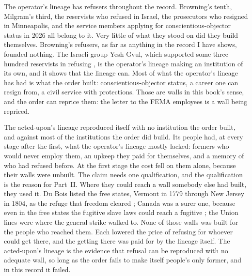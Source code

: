 The operator's lineage has refusers throughout the record. Browning's tenth, Milgram's third, the reservists who refused in Israel, the prosecutors who resigned in Minneapolis, and the service members applying for conscientious-objector status in 2026 all belong to it. Very little of what they stood on did they build themselves. Browning's refusers, as far as anything in the record I have shows, founded nothing. The Israeli group Yesh Gvul, which supported some three hundred reservists in refusing \autocite{ziv2025refusers}, is the operator's lineage making an institution of its own, and it shows that the lineage can. Most of what the operator's lineage has had is what the order built: conscientious-objector status, a career one can resign from, a civil service with protections. Those are walls in this book's sense, and the order can reprice them: the letter to the FEMA employees is a wall being repriced.

The acted-upon's lineage reproduced itself with no institution the order built, and against most of the institutions the order did build. Its people had, at every stage after the first, what the operator's lineage mostly lacked: formers who would never employ them, an upkeep they paid for themselves, and a memory of who had refused before. At the first stage the cost fell on them alone, because their walls were unbuilt. The claim needs one qualification, and the qualification is the reason for Part~II. Where they could reach a wall somebody else had built, they used it. Du Bois listed the free states, Vermont in 1779 through New Jersey in 1804, as the refuge that freedom cleared \autocite[25–26]{dubois1907economic}; Canada was a surer one, because even in the free states the fugitive slave laws could reach a fugitive \autocite[26]{dubois1907economic}; the Union lines were where the general strike walked to. None of those walls was built for the people who reached them. Each lowered the price of refusing for whoever could get there, and the getting there was paid for by the lineage itself. The acted-upon's lineage is the evidence that refusal can be reproduced with no adequate wall, so long as the order fails to make itself people's only former, and in this record it failed.

